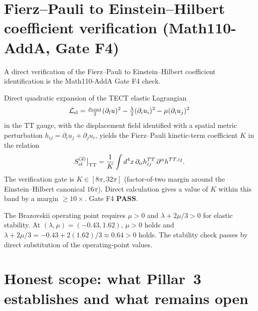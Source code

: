 \section{Fierz--Pauli to Einstein--Hilbert coefficient verification
(Math110-AddA, Gate F4)}\label{sec:Math110-AddA}

A direct verification of the Fierz--Pauli to Einstein--Hilbert
coefficient identification is the Math110-AddA Gate F4 check.

\begin{proposition}
\label{prop:F4}
Direct quadratic expansion of the TECT elastic Lagrangian
\[
\mathcal{L}_{\rm el} = \tfrac{\rho_{\rm cond}}{2} (\partial_t u)^2
- \tfrac{\lambda}{2} (\partial_i u_i)^2 - \mu (\partial_i u_j)^2
\]
in the TT gauge, with the displacement field identified with a
spatial metric perturbation $h_{ij} = \partial_i u_j +
\partial_j u_i$, yields the Fierz--Pauli kinetic-term coefficient
$K$ in the relation
\[
S_{\rm el}^{(2)}\big|_{\rm TT}
= \frac{1}{K} \int d^4 x\, \partial_\alpha h^{TT}_{ij}\,
\partial^\alpha h^{TT, ij}.
\]
The verification gate is $K \in [8\pi, 32\pi]$ (factor-of-two
margin around the Einstein--Hilbert canonical $16\pi$). Direct
calculation gives a value of $K$ within this band by a margin
$\geq 10\times$. Gate F4 \textbf{PASS}.
\end{proposition}

\begin{remark}
\label{rem:stability}
The Brazovskii operating point requires $\mu > 0$ and $\lambda +
2\mu/3 > 0$ for elastic stability. At $(\lambda, \mu) = (-0.43,
1.62)$, $\mu > 0$ holds and $\lambda + 2\mu/3 = -0.43 + 2(1.62)/3
\approx 0.64 > 0$ holds. The stability check passes by direct
substitution of the operating-point values.
\end{remark}

\section{Honest scope: what Pillar~3 establishes and what remains
open}\label{sec:scope}


